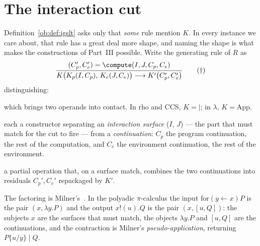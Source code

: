 \section{The interaction cut}
\label{ob:subsec:cut}

Definition~\ref{ob:def:igslt} asks only that \emph{some} rule mention $K$. In every
instance we care about, that rule has a great deal more shape, and naming the shape is
what makes the constructions of Part~III possible. Write the generating rule of $R$ as
\[
  \frac{(C_p', C_e') = \compute(I, J, C_p, C_e)}
       {K\bigl(K_p(I, C_p),\, K_e(J, C_e)\bigr) \longrightarrow K'\bigl(C_p', C_e'\bigr)}
  \tag{$\dagger$}
\]
distinguishing:

\begin{description}[leftmargin=1.5em,style=nextline]
\item[the interaction constructor $K$,] which brings two operands into contact. In rho
  and CCS, $K = {\mid}$; in $\lambda$, $K = \mathrm{App}$.

\item[two introductions $K_p(I,C_p)$ and $K_e(J,C_e)$,] each a constructor separating an
  \emph{interaction surface} ($I$, $J$) --- the part that must match for the cut to fire
  --- from a \emph{continuation}: $C_p$ the program continuation, the rest of the
  computation, and $C_e$ the environment continuation, the rest of the environment.

\item[the contraction $\compute$,] a partial operation that, on a surface match,
  combines the two continuations into residuals $C_p', C_e'$ repackaged by $K'$.
\end{description}

The factoring is Milner's~\cite{Milner1992}. In the polyadic $\pi$-calculus the input
$\mathrm{for}(y \leftarrow x)P$ is the pair $(x, \lambda y.P)$ and the output $x!(u).Q$
is the pair $(x, [u,Q])$: the subjects $x$ are the surfaces that must match, the objects
$\lambda y.P$ and $[u,Q]$ are the continuations, and the contraction is Milner's
\emph{pseudo-application}, returning $P\{u/y\} \mid Q$.

\begin{center}
\end{center}


